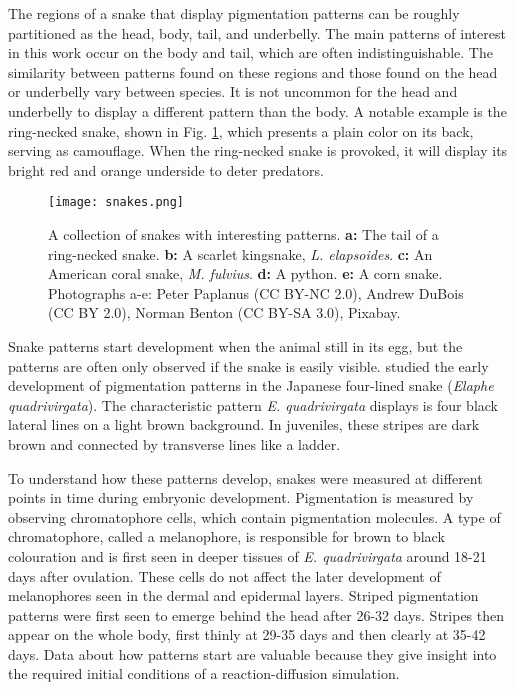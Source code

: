 The regions of a snake that display pigmentation patterns can be roughly partitioned as the head, body, tail, and underbelly. The main patterns of interest in this work occur on the body and tail, which are often indistinguishable. The similarity between patterns found on these regions and those found on the head or underbelly vary between species. It is not uncommon for the head and underbelly to display a different pattern than the body. A notable example is the ring-necked snake, shown in Fig. \ref{fig:realSnakePatterns}, which presents a plain color on its back, serving as camouflage. When the ring-necked snake is provoked, it will display its bright red and orange underside to deter predators.

\begin{figure}[hb]
	\centering
	\texttt{[image: snakes.png]}
	\caption{A collection of snakes with interesting patterns. \textbf{a:} The tail of a ring-necked snake. \textbf{b:} A scarlet kingsnake, \textit{L. elapsoides}. \textbf{c:} An American coral snake, \textit{M. fulvius}. \textbf{d:} A python. \textbf{e:} A corn snake. \textcolor{citation-gray}{Photographs a-e: Peter Paplanus (CC BY-NC 2.0), Andrew DuBois (CC BY 2.0), Norman Benton (CC BY-SA 3.0), Pixabay.}}
	\label{fig:realSnakePatterns}
\end{figure}

Snake patterns start development when the animal still in its egg, but the patterns are often only observed if the snake is easily visible. \citet{murakami2018} studied the early development of pigmentation patterns in the Japanese four-lined snake (\textit{Elaphe quadrivirgata}). The characteristic pattern \textit{E. quadrivirgata} displays is four black lateral lines on a light brown background. In juveniles, these stripes are dark brown and connected by transverse lines like a ladder. 
 
To understand how these patterns develop, snakes were measured at different points in time during embryonic development. Pigmentation is measured by observing chromatophore cells, which contain pigmentation molecules. A type of chromatophore, called a melanophore, is responsible for brown to black colouration and is first seen in deeper tissues of \textit{E. quadrivirgata} around 18-21 days after ovulation. These cells do not affect the later development of melanophores seen in the dermal and epidermal layers. Striped pigmentation patterns were first seen to emerge behind the head after 26-32 days. Stripes then appear on the whole body, first thinly at 29-35 days and then clearly at 35-42 days. Data about how patterns start are valuable because they give insight into the required initial conditions of a reaction-diffusion simulation.

